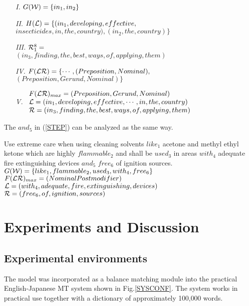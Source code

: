 \begin{itemize}
  \item[{\sl I.}] $G({\cal W}) =  \{ in_{1},in_{2} \}$
  \item[{\sl II.}] $H({\cal L}) = \\
				  \{(in_{1},developing,effective,$ 
$insecticides, in,the,country) ,(in_{2},the,country) \} $
  \item[{\sl III.}] ${\cal R}_{1}^{8}  =$\\
				  $(in_{3},finding,the, best,ways, of, applying, them )$ 
  \item[{\sl IV.}] $F({\cal LR}) =  \{ \cdots,(Preposition,Nominal),$  
                                     $(Preposition,Gerund,Nominal)\}$
  \item[{\sl V.}] 
$\begin{array}{l}
F({\cal LR})_{max} = (Preposition,Gerund,Nominal) \\
{\cal L} = (in_{1},developing,effective,\cdots,in,the,country) \\
{\cal R} = (in_{3},finding,the, best, ways, of, applying, them )
    \end{array}$
\end{itemize}

The $and_{5}$ in (\ref{STEP}) can be analyzed as the same way.

\mylistin
\item
 Use extreme care when using cleaning solvents $like_{1}$ acetone and methyl
ethyl ketone which are highly $flammable_{2}$ and shall be $used_{3}$
in areas $with_{4}$ adequate fire extinguishing devices $and_{5}$
$free_{6}$ of ignition sources.
\label{STEP}
\mylistend
$ G({\cal W}) = \{like_{1},flammable_{2},used_{3},with_{4},free_{6} \}$\\
$ F({\cal LR})_{max} =  (Nominal\-Postmodifier) $\\
$ {\cal L} = (with_{4}, adequate, fire, extinguishing,devices ) $\\
$ {\cal R} = (free_{6}, of, ignition, sources ) $


\section{Experiments and Discussion}

\subsection{Experimental environments}
The model was incorporated as a balance matching module into the
practical English-Japanese MT system shown in
Fig.\ref{SYSCONF}\cite{Muraki86,Okumura87,Okumura91}.
The system works in practical use together with a dictionary of
approximately 100,000 words. 

